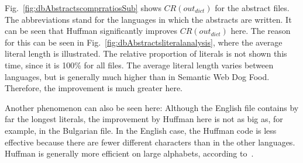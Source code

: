 Fig.~\ref{fig:dbAbstractscomprratiosSub} shows $CR(out_{dict})$ for the abstract files. The abbreviations stand for the languages in which the abstracts are written. It can be seen that Huffman significantly improves $CR(out_{dict})$ here. The reason for this can be seen in Fig.~\ref{fig:dbAbstractsliteralanalysis}, where the average literal length is illustrated. The relative proportion of literals is not shown this time, since it is 100\% for all files. The average literal length varies between languages, but is generally much higher than in Semantic Web Dog Food. Therefore, the improvement is much greater here.

Another phenomenon can also be seen here: Although the English file contains by far the longest literals, the improvement by Huffman here is not as big as, for example, in the Bulgarian file. In the English case, the Huffman code is less effective because there are fewer different characters than in the other languages. Huffman is generally more efficient on large alphabets, according to~\cite{huffman}.


